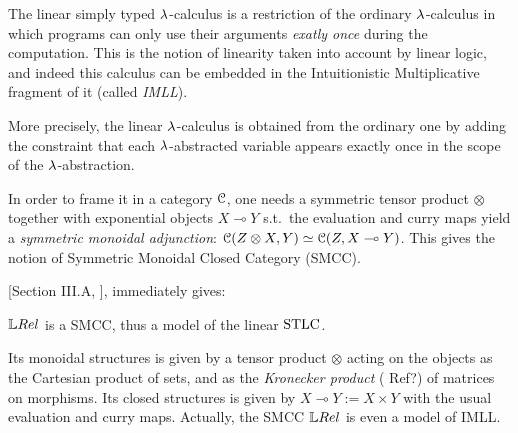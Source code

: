 The linear simply typed $\lambda$-calculus is a restriction of the ordinary $\lambda$-calculus in which programs can only use their arguments \emph{exatly once} during the computation.
This is the notion of linearity taken into account by linear logic, and indeed this calculus can be embedded in the Intuitionistic Multiplicative fragment of it (called \emph{IMLL}).

More precisely, the linear $\lambda$-calculus is obtained from the ordinary one by adding the constraint that each $\lambda$-abstracted variable appears exactly once in the scope of the $\lambda$-abstraction.

In order to frame it in a category $\mathcal{C}$, one needs a symmetric tensor product $\otimes$ together with exponential objects $X\multimap Y$ s.t.\ the evaluation and curry maps yield a \emph{symmetric monoidal adjunction}: $\mathcal{C}(Z\otimes X, Y) \simeq \mathcal{C} (Z, X\multimap Y)$.
This gives the notion of Symmetric Monoidal Closed Category (SMCC).

[Section III.A, \cite{Manzo2013}], immediately gives:

\begin{fact}\label{fact:LREL_SMCC}
 $\LREL$ is a SMCC, thus a model of the linear $\mathrm{STLC}$.
\end{fact}

Its monoidal structures is given by a tensor product $\otimes$ acting on the objects as the Cartesian product of sets, and as the \emph{Kronecker product} {(\color{red} Ref?)} of matrices on morphisms.
Its closed structures is given by $X\multimap Y:=X\times Y$ with the usual evaluation and curry maps.
Actually, the SMCC $\LREL$ is even a model of IMLL.
